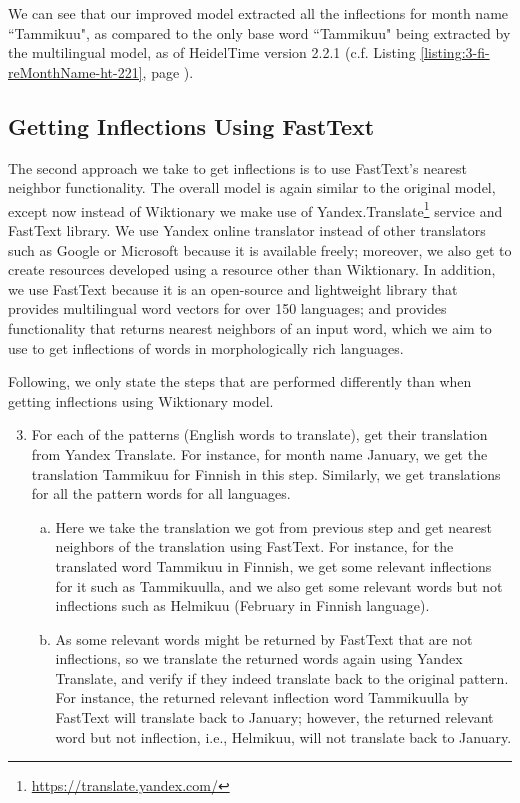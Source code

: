 We can see that our improved model extracted all the inflections for month name ``Tammikuu", as compared to the only base word ``Tammikuu" being extracted by the multilingual model, as of HeidelTime version 2.2.1 (c.f. Listing \ref{listing:3-fi-reMonthName-ht-221}, page \pageref{listing:3-fi-reMonthName-ht-221}). 
\subsection{Getting Inflections Using FastText} \label{sec4b2}
The second approach we take to get inflections is to use FastText's nearest neighbor functionality. The overall model is again similar to the original model, except now instead of Wiktionary we make use of Yandex.Translate\footnote{\url{https://translate.yandex.com/}} service and FastText library. We use Yandex online translator instead of other translators such as Google or Microsoft because it is available freely; moreover, we also get to create resources developed using a resource other than Wiktionary. In addition, we use FastText because it is an open-source and lightweight library that provides multilingual word vectors for over 150 languages; and provides functionality that returns nearest neighbors of an input word, which we aim to use to get inflections of words in morphologically rich languages.

Following, we only state the steps that are performed differently than when getting inflections using Wiktionary model.

\begin{enumerate}[1.]
	\setcounter{enumi}{2}
	\item For each of the patterns (English words to translate), get their translation from Yandex Translate. For instance, for month name January, we get the translation Tammikuu for Finnish in this step. Similarly, we get translations for all the pattern words for all languages. 
	\begin{enumerate}[a.]
		\item Here we take the translation we got from previous step and get nearest neighbors of the translation using FastText. For instance, for the translated word Tammikuu in Finnish, we get some relevant inflections for it such as Tammikuulla, and we also get some relevant words but not inflections such as Helmikuu (February in Finnish language).  
		\item As some relevant words might be returned by FastText that are not inflections, so we translate the returned words again using Yandex Translate, and verify if they indeed translate back to the original pattern. For instance, the returned relevant inflection word Tammikuulla by FastText will translate back to January; however, the returned relevant word but not inflection, i.e., Helmikuu, will not translate back to January. 
	\end{enumerate}
\end{enumerate}

